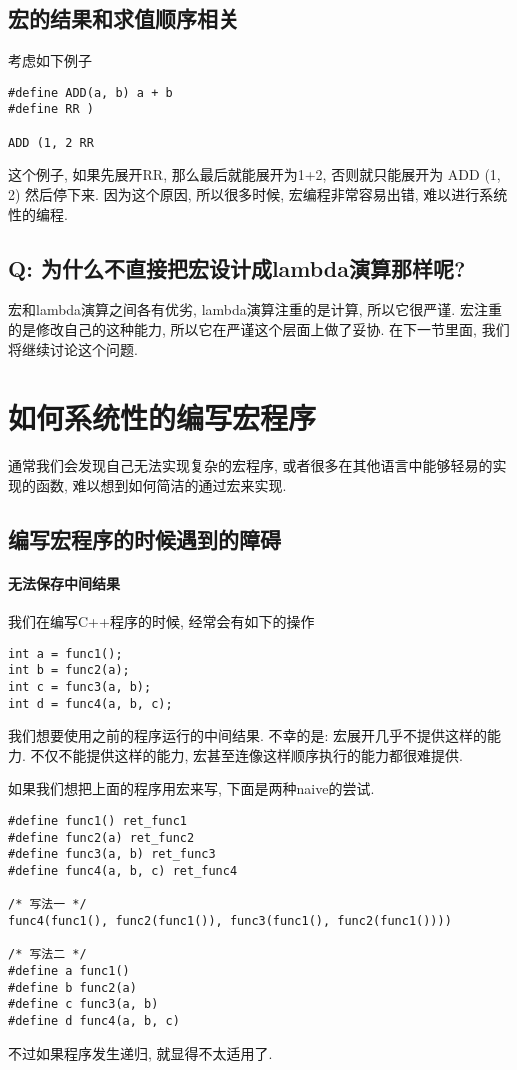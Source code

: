 \documentclass{article}
\begin{document}
\subsection{宏的结果和求值顺序相关}
考虑如下例子
\begin{verbatim}
#define ADD(a, b) a + b
#define RR )

ADD (1, 2 RR
\end{verbatim}
这个例子, 如果先展开RR, 那么最后就能展开为1+2,
否则就只能展开为 ADD (1, 2) 然后停下来.
因为这个原因, 所以很多时候, 宏编程非常容易出错, 难以进行系统性的编程.

\subsection{Q: 为什么不直接把宏设计成lambda演算那样呢?}
宏和lambda演算之间各有优劣, lambda演算注重的是计算, 所以它很严谨.
宏注重的是修改自己的这种能力, 所以它在严谨这个层面上做了妥协.
在下一节里面, 我们将继续讨论这个问题.

\section{如何系统性的编写宏程序}
通常我们会发现自己无法实现复杂的宏程序, 或者很多在其他语言中能够轻易的实现的函数, 难以想到如何简洁的通过宏来实现.
\subsection{编写宏程序的时候遇到的障碍}
\paragraph{无法保存中间结果}
我们在编写C++程序的时候, 经常会有如下的操作
\begin{verbatim}
int a = func1();
int b = func2(a);
int c = func3(a, b);
int d = func4(a, b, c);
\end{verbatim}
我们想要使用之前的程序运行的中间结果.
不幸的是: 宏展开几乎不提供这样的能力.
不仅不能提供这样的能力, 宏甚至连像这样顺序执行的能力都很难提供.

如果我们想把上面的程序用宏来写, 下面是两种naive的尝试.
\begin{verbatim}
#define func1() ret_func1
#define func2(a) ret_func2
#define func3(a, b) ret_func3
#define func4(a, b, c) ret_func4

/* 写法一 */
func4(func1(), func2(func1()), func3(func1(), func2(func1())))

/* 写法二 */
#define a func1()
#define b func2(a)
#define c func3(a, b)
#define d func4(a, b, c)
\end{verbatim}
不过如果程序发生递归, 就显得不太适用了.
\end{document}
